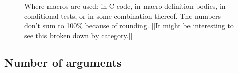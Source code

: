 \documentclass[10pt]{article}
\begin{document}


\begin{figure}
{\small
  \setlength{\tabcolsep}{.25em}
}
\caption{Where macros are used: in C code, in macro definition bodies, in
  conditional tests, or in some combination thereof.  The numbers don't sum to
  100\% because of rounding.  [[It might be interesting to see this
  broken down by category.]]}
\label{fig:where-used}
\end{figure}






\subsection{Number of arguments}
\end{document}

